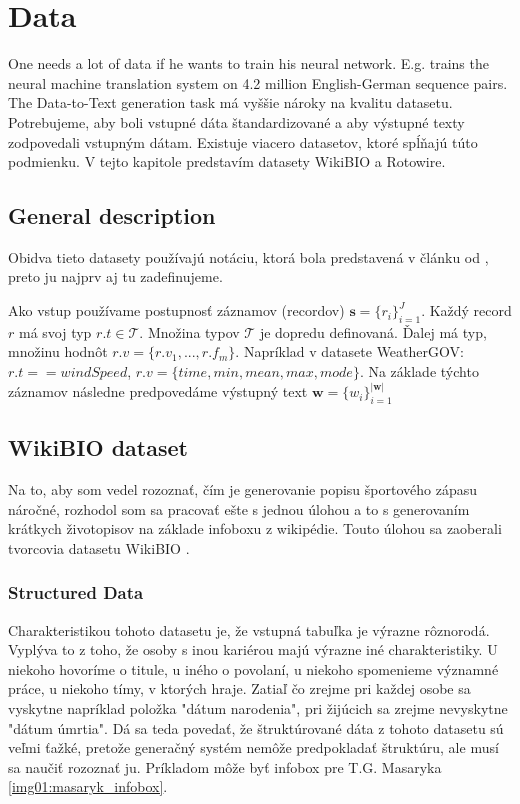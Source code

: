 \chapter{Data}

One needs a lot of data if he wants to train his neural network. E.g. \citep{sennrich2016} trains the neural machine translation system on 4.2 million English-German sequence pairs. The Data-to-Text generation task má vyššie nároky na kvalitu datasetu. Potrebujeme, aby boli vstupné dáta štandardizované a aby výstupné texty zodpovedali vstupným dátam. Existuje viacero datasetov, ktoré spĺňajú túto podmienku. V tejto kapitole predstavím datasety WikiBIO a Rotowire.

\section{General description}


Obidva tieto datasety používajú notáciu, ktorá bola predstavená v článku od \citep{liang-etal-2009-learning}, preto ju najprv aj tu zadefinujeme.

Ako vstup používame postupnosť záznamov (recordov) $ \mathbf{s} = \{ r_i \}_{i=1}^{J} $. Každý record $ r $ má svoj typ $ r.t \in \mathcal{T} $. Množina typov $\mathcal{T}$ je dopredu definovaná. Ďalej má typ, množinu hodnôt $ r.v = \{ r.v_1, ... , r.f_m\}$. Napríklad v datasete WeatherGOV: $ r.t == windSpeed $, $ r.v = \{time, min, mean, max, mode\}$. Na základe týchto záznamov následne predpovedáme výstupný text $ \mathbf{w} = \{ w_i\}_{i=1}^{ | \mathbf{w} | }$

\section{WikiBIO dataset}

Na to, aby som vedel rozoznať, čím je generovanie popisu športového zápasu náročné, rozhodol som sa pracovať ešte s jednou úlohou a to s generovaním krátkych životopisov na základe infoboxu z wikipédie. Touto úlohou sa zaoberali tvorcovia datasetu WikiBIO \citep{lebret2016neural}.

\subsection{Structured Data}

Charakteristikou tohoto datasetu je, že vstupná tabuľka je výrazne rôznorodá. Vyplýva to z toho, že osoby s inou kariérou majú výrazne iné charakteristiky.  U niekoho hovoríme o titule, u iného o povolaní, u niekoho spomenieme významné práce, u niekoho tímy, v ktorých hraje. Zatiaľ čo zrejme pri každej osobe sa vyskytne napríklad položka "dátum narodenia", pri žijúcich sa zrejme nevyskytne "dátum úmrtia". Dá sa teda povedať, že štruktúrované dáta z tohoto datasetu sú veľmi ťažké, pretože generačný systém nemôže predpokladať štruktúru, ale musí sa naučiť rozoznať ju. Príkladom môže byť infobox pre T.G. Masaryka \ref{img01:masaryk_infobox}.

